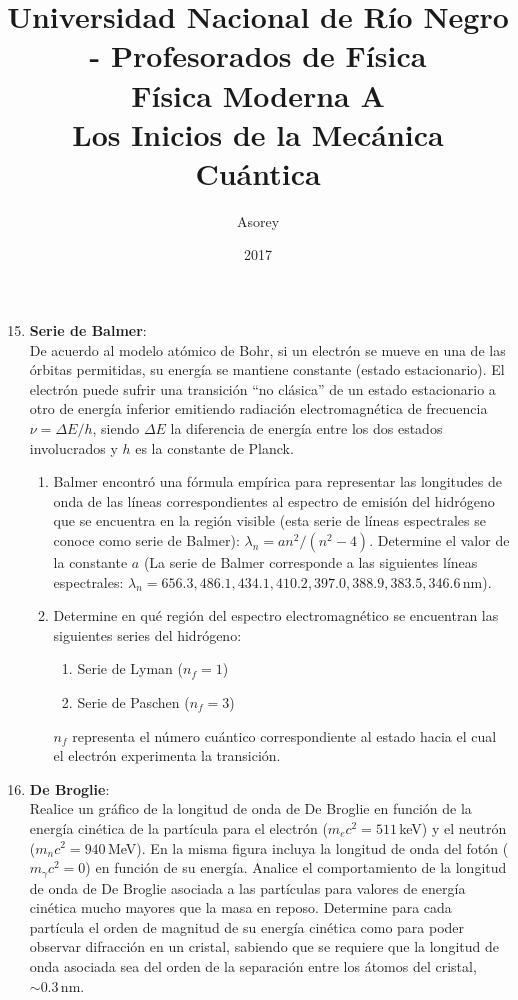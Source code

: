 \documentclass[a4paper,12pt]{article}
\begin{document}
\title{
{\normalsize{Universidad Nacional de Río Negro - Profesorados de Física}}\\
Física Moderna A \\ Los Inicios de la Mecánica Cuántica\\}
\author{Asorey}
\date{2017}
\maketitle

\begin{enumerate}
\setcounter{enumi}{14}      %

\item {\bf{Serie de Balmer}}:\\
	De acuerdo al modelo atómico de Bohr, si un electrón se mueve en una de las
		órbitas permitidas, su energía se mantiene constante (estado
		estacionario). El electrón puede sufrir una transición ``no clásica''
		de un estado estacionario a otro de energía inferior emitiendo
		radiación electromagnética de frecuencia $\nu = \Delta E/h$, siendo
		$\Delta E$ la diferencia de energía entre los dos estados involucrados
		y $h$ es la constante de Planck.
	\begin{enumerate}
		\item Balmer encontró una fórmula empírica para representar las
			longitudes de onda de las líneas correspondientes al espectro de
			emisión del hidrógeno que se encuentra en la región visible (esta
			serie de líneas espectrales se conoce como serie de Balmer):
			$\lambda_n = a n^2 / (n^2 - 4)$. Determine el valor de la constante
			$a$ (La serie de Balmer corresponde a las siguientes líneas
			espectrales: $\lambda_n=656.3, 486.1, 434.1, 410.2, 397.0, 388.9,
			383.5, 346.6$\,nm).
		\item Determine en qué región del espectro electromagnético se
			encuentran las siguientes series del hidrógeno:
			\begin{enumerate}
				\item Serie de Lyman ($n_f = 1$)
				\item Serie de Paschen ($n_f = 3$)
			\end{enumerate}
			$n_f$ representa el número cuántico correspondiente al estado hacia
			el cual el electrón experimenta la transición.
	\end{enumerate}

\item {\bf{De Broglie}}:\\
	Realice un gráfico de la longitud de onda de De Broglie en función de la
		energía cinética de la partícula para el electrón ($m_e c^2 =
		511$\,keV) y el neutrón ($m_n c^2 = 940$\,MeV). En la misma figura
		incluya la longitud de onda del fotón ($m_\gamma c^2 = 0$) en función
		de su energía. Analice el comportamiento de la longitud de onda de De
		Broglie asociada a las partículas para valores de energía cinética
		mucho mayores que la masa en reposo. Determine para cada partícula el
		orden de magnitud de su energía cinética como para poder observar
		difracción en un cristal, sabiendo que se requiere que la longitud de
		onda asociada sea del orden de la separación entre los átomos del
		cristal, $\sim 0.3$\,nm.


\end{enumerate}
\end{document}
